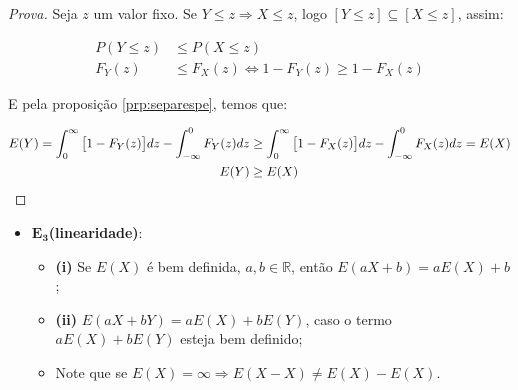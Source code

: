 \documentclass[
]{article}
\providecommand{\tightlist}{%
  \setlength{\itemsep}{0pt}\setlength{\parskip}{0pt}}
\theoremstyle{definition}
\theoremstyle{definition}
\theoremstyle{definition}
\theoremstyle{definition}
\theoremstyle{remark}
\begin{document}
\begin{proof}[Prova]
Seja \(z\) um valor fixo. Se \(Y \le z \Rightarrow X \le z\), logo \([Y \le z] \subseteq [X \le z]\), assim:

\begin{align*}
P(Y \le z) &\le P(X \le z) \\
F_{Y}(z) &\le F_{X}(z) \Longleftrightarrow 1 - F_{Y}(z) \ge 1 - F_{X}(z)
\end{align*}

E pela proposição \ref{prp:separespe}, temos que:

\begin{align*}
E(Y) = \int_{0}^{\infty}\big{[}1 - F_{Y}(z)\big{]}dz - \int_{-\infty}^{0}F_{Y}(z)dz &\ge \int_{0}^{\infty}\big{[}1 - F_{X}(z)\big{]}dz - \int_{-\infty}^{0}F_{X}(z)dz = E(X) \\
E(Y) &\ge E(X)
\end{align*}
\end{proof}

\begin{itemize}
\tightlist
\item
  \(\mathbf{E_{3}}\)\textbf{(linearidade)}:

  \begin{itemize}
  \tightlist
  \item
    \textbf{(i)} Se \(E(X)\) é bem definida, \(a,b \in \mathbb{R}\), então \(E(aX + b) = aE(X) + b\);
  \item
    \textbf{(ii)} \(E(aX + bY) = aE(X) + bE(Y)\), caso o termo \(aE(X) + bE(Y)\) esteja bem definido;
  \item
    Note que se \(E(X) = \infty \Rightarrow E(X - X) \neq E(X) - E(X)\).
  \end{itemize}
\end{itemize}
\end{document}
